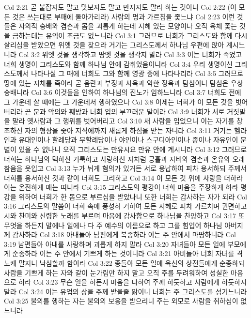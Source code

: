 Col 2:21  곧 붙잡지도 말고 맛보지도 말고 만지지도 말라 하는 것이니
Col 2:22  (이 모든 것은 쓰는대로 부패에 돌아가리라) 사람의 명과 가르침을 좇느냐
Col 2:23  이런 것들은 자의적 숭배와 겸손과 몸을 괴롭게 하는데 지혜 있는 모양이나 오직 육체 좇는 것을 금하는데는 유익이 조금도 없느니라
Col 3:1  그러므로 너희가 그리스도와 함께 다시 살리심을 받았으면 위엣 것을 찾으라 거기는 그리스도께서 하나님 우편에 앉아 계시느니라
Col 3:2  위엣 것을 생각하고 땅엣 것을 생각지 말라
Col 3:3  이는 너희가 죽었고 너희 생명이 그리스도와 함께 하나님 안에 감취었음이니라
Col 3:4  우리 생명이신 그리스도께서 나타나실 그 때에 너희도 그와 함께 영광 중에 나타나리라
Col 3:5  그러므로 땅에 있는 지체를 죽이라 곧 음란과 부정과 사욕과 악한 정욕과 탐심이니 탐심은 우상 숭배니라
Col 3:6  이것들을 인하여 하나님의 진노가 임하느니라
Col 3:7  너희도 전에 그 가운데 살 때에는 그 가운데서 행하였으나
Col 3:8  이제는 너희가 이 모든 것을 벗어버리라 곧 분과 악의와 훼방과 너희 입의 부끄러운 말이라
Col 3:9  너희가 서로 거짓말을 말라 옛사람과 그 행위를 벗어버리고
Col 3:10  새 사람을 입었으니 이는 자기를 창조하신 자의 형상을 좇아 지식에까지 새롭게 하심을 받는 자니라
Col 3:11  거기는 헬라인과 유대인이나 할례당과 무할례당이나 야인이나 스구디아인이나 종이나 자유인이 분별이 있을 수 없나니 오직 그리스도는 만유시요 만유 안에 계시니라
Col 3:12  그러므로 너희는 하나님의 택하신 거룩하고 사랑하신 자처럼 긍휼과 자비와 겸손과 온유와 오래 참음을 옷입고
Col 3:13  누가 뉘게 혐의가 있거든 서로 용납하여 피차 용서하되 주께서 너희를 용서하신 것과 같이 너희도 그리하고
Col 3:14  이 모든 것 위에 사랑을 더하라 이는 온전하게 매는 띠니라
Col 3:15  그리스도의 평강이 너희 마음을 주장하게 하라 평강을 위하여 너희가 한 몸으로 부르심을 받았나니 또한 너희는 감사하는 자가 되라
Col 3:16  그리스도의 말씀이 너희 속에 풍성히 거하여 모든 지혜로 피차 가르치며 권면하고 시와 찬미와 신령한 노래를 부르며 마음에 감사함으로 하나님을 찬양하고
Col 3:17  또 무엇을 하든지 말에나 일에나 다 주 예수의 이름으로 하고 그를 힘입어 하나님 아버지께 감사하라
Col 3:18  아내들아 남편에게 복종하라 이는 주 안에서 마땅하니라
Col 3:19  남편들아 아내를 사랑하며 괴롭게 하지 말라
Col 3:20  자녀들아 모든 일에 부모에게 순종하라 이는 주 안에서 기쁘게 하는 것이니라
Col 3:21  아비들아 너희 자녀를 격노케 말지니 낙심할까 함이라
Col 3:22  종들아 모든 일에 육신의 상전들에게 순종하되 사람을 기쁘게 하는 자와 같이 눈가림만 하지 말고 오직 주를 두려워하여 성실한 마음으로 하라
Col 3:23  무슨 일을 하든지 마음을 다하여 주께 하듯하고 사람에게 하듯하지 말라
Col 3:24  이는 유업의 상을 주께 받을줄 앎이니 너희는 주 그리스도를 섬기느니라
Col 3:25  불의를 행하는 자는 불의의 보응을 받으리니 주는 외모로 사람을 취하심이 없느니라
